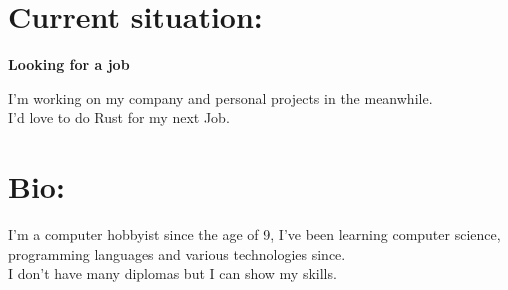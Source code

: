 \documentclass[a4paper,10pt]{article}
\begin{document}
%
%
%
\hfill
\begin{adjustbox}{valign=t}
\begin{minipage}{0.05\textwidth} %
\MyVerticalRule  %
\end{minipage}
\end{adjustbox}
\hfill
%
\begin{adjustbox}{valign=t}
\begin{minipage}{0.6\textwidth} %
\section*{Current situation:}
\begin{description}
\raggedright
\item[\normalfont \textcolor{ColorOne}{August. 2023 -- Now.}] \textbf{Looking for a job}\\ \medskip

	\begin{spacing}{1.0}
		I'm working on my company and personal projects in the meanwhile.\\
		I'd love to do Rust for my next Job.
	\end{spacing}

\vspace{-0.9\baselineskip}
\end{description}

\section*{Bio:}
\begin{spacing}{1.0}

\vspace{-0.6\baselineskip}

\hspace{5mm} I'm a computer hobbyist since the age of 9, I've been learning computer science,
programming languages and various technologies since.\\
I don't have many diplomas but I can show my skills.
\end{spacing}
\vspace{-0.8\baselineskip}

\end{minipage}
\end{adjustbox}
\end{document}
